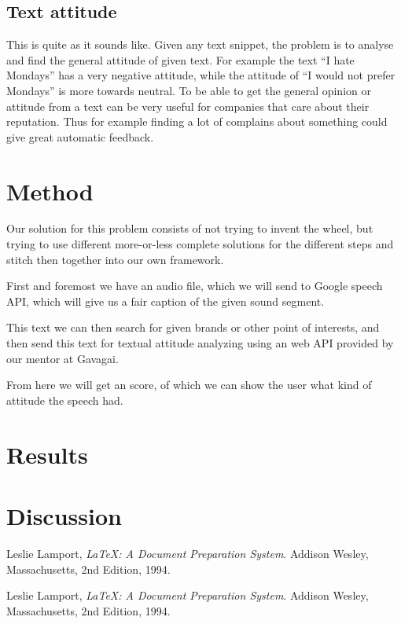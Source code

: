 \documentclass[a4paper,11pt,twoside]{ltxdoc}
\begin{document}
\subsection{Text attitude}
This is quite as it sounds like. Given any text snippet,
the problem is to analyse and find the general attitude of given text.
For example the text ``I hate Mondays'' has a very negative attitude,
while the attitude of ``I would not prefer Mondays'' is more towards neutral.
To be able to get the general opinion or attitude from a text can be very useful for companies that care about their reputation.
Thus for example finding a lot of complains about something could give great automatic feedback.


\section{Method}
Our solution for this problem consists of not trying to invent the wheel, but trying to use different
more-or-less complete solutions for the different steps and stitch then together into our own framework.

First and foremost we have an audio file, which we will send to Google speech API, which will give us a fair caption of the given sound segment.

This text we can then search for given brands or other point of interests, and then send this text for textual attitude analyzing using an web API provided by our mentor at Gavagai.

From here we will get an score, of which we can show the user what kind of attitude the speech had. 

\section{Results}


\section{Discussion}


\newpage
\begin{thebibliography}{9}

  Leslie Lamport,
  \emph{\LaTeX: A Document Preparation System}.
  Addison Wesley, Massachusetts,
  2nd Edition,
  1994.

  Leslie Lamport,
  \emph{\LaTeX: A Document Preparation System}.
  Addison Wesley, Massachusetts,
  2nd Edition,
  1994.


\end{thebibliography}
\end{document}
